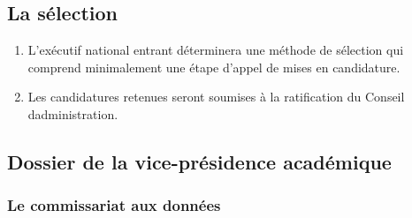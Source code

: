 \subsection{La sélection}
\label{la-selection}

\begin{enumerate}
 \item
  L'exécutif national entrant déterminera une méthode de sélection qui comprend minimalement une étape d'appel de mises en candidature.
 \item
  Les candidatures retenues seront soumises à la ratification du Conseil d\textquotesingle administration.
\end{enumerate}

\subsection{Dossier de la vice-présidence académique}
\label{portefeuille-vpa}

\subsubsection{Le commissariat aux données}
\label{le-commissariat-aux-donnees}

